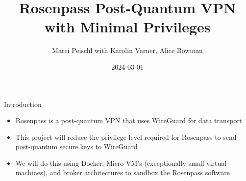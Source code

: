 \documentclass{rosenpass-beamer}
\title{Rosenpass Post-Quantum VPN with Minimal Privileges}
\author{Marei Peischl with Karolin Varner, Alice Bowman}
\institute{\url{https://rosenpass.eu}}
\date{2024-03-01}
\begin{document}
\maketitle

\begin{frame}{Introduction}
\begin{itemize}
\item Rosenpass is a post-quantum VPN that uses WireGuard for data transport
\item This project will reduce the privilege level required for Rosenpass to send post-quantum secure keys to WireGuard
\item We will do this using Docker, Micro-VM’s (exceptionally small virtual machines), and broker architectures to sandbox the Rosenpass software
\end{itemize}
\end{frame}
\end{document}
